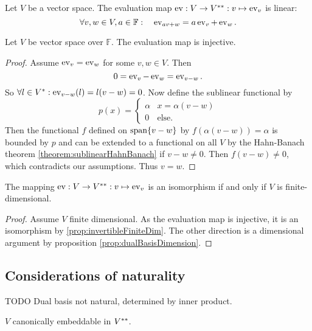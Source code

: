 \begin{lemma}
Let $V$ be a vector space. The evaluation map $\operatorname{ev}: V\to {V}^{**}: v\mapsto \operatorname{ev}_v$ is linear:
\[ \forall v,w\in V, a\in\mathbb{F}: \quad \operatorname{ev}_{av + w} = a\operatorname{ev}_v + \operatorname{ev}_w. \]
\end{lemma}
\begin{lemma}
Let $V$ be vector space over $\mathbb{F}$. The evaluation map is injective.
\end{lemma}
\begin{proof}
Assume $\operatorname{ev}_v = \operatorname{ev}_w$ for some $v,w\in V$. Then
\[ 0 = \operatorname{ev}_v - \operatorname{ev}_w  = \operatorname{ev}_{v-w}. \]
So $\forall l\in {V}^*: \operatorname{ev}_{v-w}(l) = l(v-w) = 0$. Now define the sublinear functional by
\[ p(x) = \begin{cases}
\alpha & x = \alpha(v-w) \\
0 & \text{else}.
\end{cases} \]
Then the functional $f$ defined on $\operatorname{span}\{v-w\}$ by $f(\alpha(v-w)) = \alpha$ is bounded by $p$ and can be extended to a functional on all $V$ by the Hahn-Banach theorem \ref{theorem:sublinearHahnBanach} if $v-w\neq 0$. Then $f(v-w) \neq 0$, which contradicts our assumptions. Thus $v=w$.
\end{proof}

\begin{proposition}
The mapping $\operatorname{ev}: V\to {V}^{**}: v\mapsto \operatorname{ev}_v$ is an isomorphism \textup{if and only if} $V$ is finite-dimensional.
\end{proposition}
\begin{proof}
Assume $V$ finite dimensional. As the evaluation map is injective, it is an isomorphism by \ref{prop:invertibleFiniteDim}.
The other direction is a dimensional argument by proposition \ref{prop:dualBasisDimension}.
\end{proof}

\subsection{Considerations of naturality}
TODO
Dual basis not natural, determined by inner product.

$V$ canonically embeddable in ${V}^{**}$.



